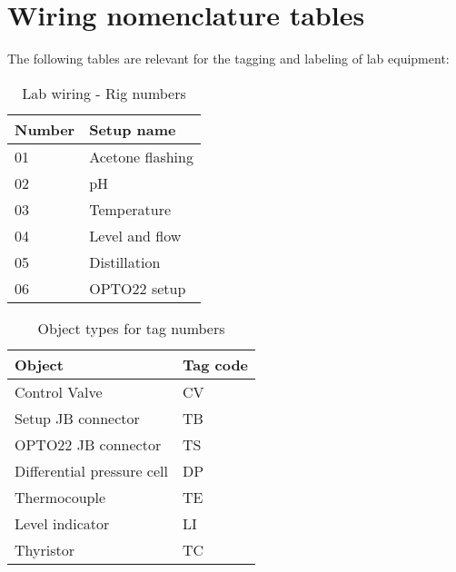 \appendix

\chapter{Wiring nomenclature tables}

The following tables are relevant for the tagging and labeling of lab equipment:

\begin{table}[H]
\centering
\caption[Rig numbers]{Lab wiring - Rig numbers}
\begin{tabular}{ll}
Number & 	Setup name \\
\hline
01 & Acetone flashing \\
02 & pH \\
03 & Temperature \\
04 & Level and flow \\
05 & Distillation \\
06 & OPTO22 setup \\
\end{tabular}
\end{table}

\begin{table}[H]
\centering
\caption[Object types]{Object types for tag numbers}
\begin{tabular}{ll}
Object & Tag code \\
\hline
Control Valve & CV \\
Setup JB connector & TB \\
OPTO22 JB connector	& TS \\
Differential pressure cell & DP \\
Thermocouple & TE \\ 
Level indicator	& LI \\
Thyristor & TC \\
\end{tabular}
\end{table}


